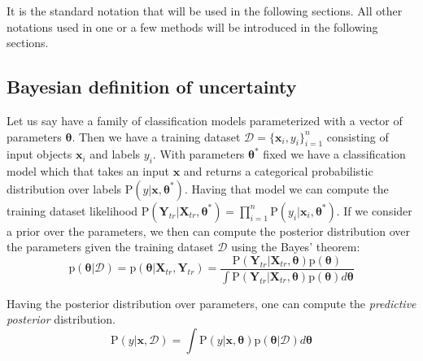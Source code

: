 \documentclass{article}
\begin{document}
It is the standard notation that will be used in the following sections. All other notations used in one or a few methods will be introduced in the following sections.

\subsection{Bayesian definition of uncertainty}
Let us say have a family of classification models parameterized with a vector of parameters $\boldsymbol{\theta}$.
Then we have a training dataset $\mathcal{D} = \{\boldsymbol{x}_i, y_i\}_{i=1}^n$ consisting of input objects $\boldsymbol{x}_i$ and labels $y_i$.
With parameters $\boldsymbol{\theta^{*}}$ fixed we have a classification model which that takes an input $\boldsymbol{x}$ and returns a categorical probabilistic distribution over labels $\mathrm{P} (y | \boldsymbol{x}, \boldsymbol{\theta^{*}})$.
Having that model we can compute the training dataset likelihood $\mathrm{P} (\boldsymbol{Y}_{tr} | \boldsymbol{X}_{tr}, \boldsymbol{\theta^{*}}) = \prod\limits_{i=1}^n \mathrm{P} (y_i | \boldsymbol{x}_i, \boldsymbol{\theta^{*}})$.
If we consider a prior over the parameters, we then can compute the posterior distribution over the parameters given the training dataset $\mathcal{D}$ using the Bayes' theorem:
\begin{equation}
\mathrm{p} (\boldsymbol{\theta} | \mathcal{D}) = \mathrm{p} (\boldsymbol{\theta} | \boldsymbol{X}_{tr}, \boldsymbol{Y}_{tr}) = \frac{\mathrm{P} (\boldsymbol{Y}_{tr} | \boldsymbol{X}_{tr}, \boldsymbol{\theta}) \mathrm{p}(\boldsymbol{\theta})}{\int \mathrm{P} (\boldsymbol{Y}_{tr} | \boldsymbol{X}_{tr}, \boldsymbol{\theta}) \mathrm{p}(\boldsymbol{\theta}) d\boldsymbol{\theta}}
\end{equation}

Having the posterior distribution over parameters, one can compute the \textit{predictive posterior} distribution.
\begin{equation}
\mathrm{P} (y | \boldsymbol{x}, \mathcal{D}) = \int \mathrm{P} (y | \boldsymbol{x}, \boldsymbol{\theta}) \mathrm{p} (\boldsymbol{\theta} | \mathcal{D}) d\boldsymbol{\theta}
\end{equation}
\end{document}
